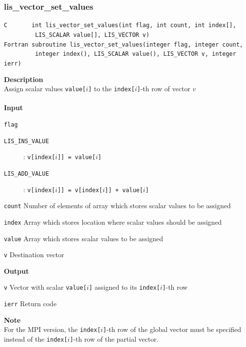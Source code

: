 \documentclass[a4paper]{article}
\newcommand{\namelistlabel}[1]{\mbox{#1}\hfill}
\newenvironment{namelist}[1]{%
 \begin{list}{}
  {\let\makelabel\namelistlabel
  \settowidth{\labelwidth}{#1}
  \setlength{\leftmargin}{1.1\labelwidth}}
}{%
\end{list}}
\begin{document}
  \subsubsection{lis\_vector\_set\_values}
\begin{screen}
\verb|C       int lis_vector_set_values(int flag, int count, int index[],|\\
\verb|         LIS_SCALAR value[], LIS_VECTOR v)|\\
\verb|Fortran subroutine lis_vector_set_values(integer flag, integer count,|\\
\verb|         integer index(), LIS_SCALAR value(), LIS_VECTOR v, integer ierr)|
\end{screen}
{\bf Description}\\
\indent
Assign scalar values {\tt value[$i$]} to the {\tt index[$i$]}-th row of vector $v$
\\ \\
\noindent
{\bf Input}
\begin{namelist}{XXXXXXXXXXXXXXXXXXXX}
\item[\tt flag] \begin{description}
\item[\tt LIS\_INS\_VALUE]: {\tt v[index[$i$]] = value[$i$]}
\item[\tt LIS\_ADD\_VALUE]: {\tt v[index[$i$]] = v[index[$i$]] + value[$i$]}
\end{description}
\item[\tt count] Number of elements of array which stores scalar values to be assigned
\item[\tt index] Array which stores location where scalar values should be assigned
\item[\tt value] Array which stores scalar values to be assigned
\item[\tt v] Destination vector
\end{namelist}
{\bf Output}
\begin{namelist}{XXXXXXXXXXXXXXXXXXXX}
\item[\tt v] Vector with scalar {\tt value[$i$]} assigned to its {\tt index[$i$]}-th row
\item[\tt ierr] Return code
\end{namelist}
{\bf Note}\\
\indent
For the MPI version, the {\tt index[$i$]}-th row of the global vector must be specified instead 
of the {\tt index[$i$]}-th row of the partial vector.
\end{document}
